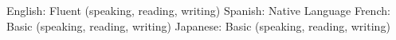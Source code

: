 \documentclass[letterpaper,MMMyyyy,nonstop]{simpleresumecv}
\begin{document}
\begin{body}
\GapNoBreak
\BulletItem
English: Fluent (speaking, reading, writing)
\GapNoBreak
\BulletItem
Spanish: Native Language
\GapNoBreak
\BulletItem
French: Basic (speaking, reading, writing)
\GapNoBreak
\BulletItem
Japanese: Basic (speaking, reading, writing)


%
%
%
%
%
\end{body}
\end{document}
